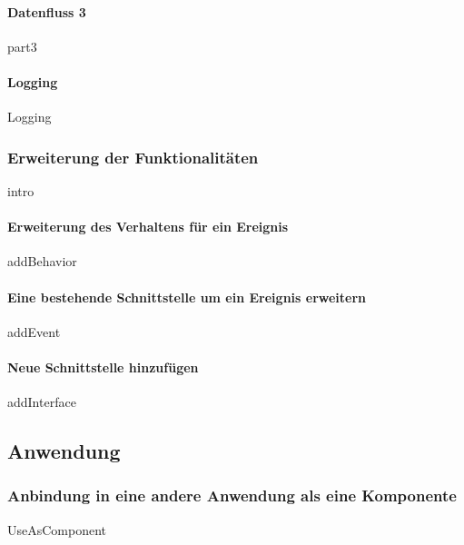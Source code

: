 \documentclass{article}
\begin{document}
            \paragraph{Datenfluss \textbf{3}}
            {part3} 

   \newpage
            \paragraph{Logging}
                {Logging}


        \newpage
        \subsubsection{Erweiterung der Funktionalitäten}
            {intro}
    
            \paragraph{Erweiterung des Verhaltens für ein Ereignis}
            \label{Verhalten für ein Ereignis erweitern}
                {addBehavior}
    
            \paragraph{Eine bestehende Schnittstelle um ein Ereignis erweitern}
                {addEvent}
            \newpage
            \paragraph{Neue Schnittstelle hinzufügen}
                {addInterface}


    \newpage
    \subsection{Anwendung}
        \subsubsection{Anbindung in eine andere Anwendung als eine Komponente}
            {UseAsComponent}
\end{document}
